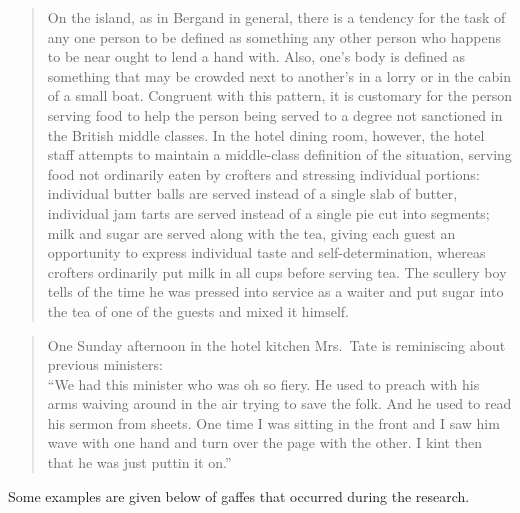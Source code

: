 \documentclass[twoside,symmetric,nobib,justified]{tufte-book}
\begin{document}
\begin{quote}
On the island, as in Bergand in general, there is a tendency for the
task of any one person to be defined as something any other person who
happens to be near ought to lend a hand with. Also, one's body is
defined as something that may be crowded next to another's in a lorry or
in the cabin of a small boat. Congruent with this pattern, it is
customary for the person serving food to help the person being served to
a degree not sanctioned in the British middle classes. In the hotel
dining room, however, the hotel staff attempts to maintain a
middle-class definition of the situation, serving food not ordinarily
eaten by crofters and stressing individual portions: individual butter
balls are served instead of a single slab of butter, individual jam
tarts are served instead of a single pie cut into segments; milk and
sugar are served along with the tea, giving each guest an opportunity to
express individual taste and self-determination, whereas crofters
ordinarily put milk in all cups before serving tea. The scullery boy
tells of the time he was pressed into service as a waiter and put sugar
into the tea of one of the guests and mixed it himself.
\end{quote}

\begin{quote}
One Sunday afternoon in the hotel kitchen Mrs.~Tate is reminiscing about
previous ministers:\\
``We had this minister who was oh so fiery. He used to preach with his
arms waiving around in the air trying to save the folk. And he used to
read his sermon from sheets. One time I was sitting in the front and I
saw him wave with one hand and turn over the page with the other. I kint
then that he was just puttin it on.''
\end{quote}

Some examples are given below of gaffes that occurred during the
research.
\end{document}
